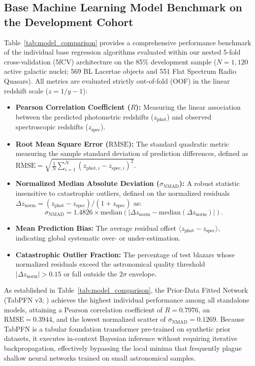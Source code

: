\documentclass[twocolumn,linenumbers,floatfix]{aastex701}
\begin{document}
\subsection{Base Machine Learning Model Benchmark on the Development Cohort}
\label{subsec:base_models_benchmark}

Table~\ref{tab:model_comparison} provides a comprehensive performance benchmark of the individual base regression algorithms evaluated within our nested 5-fold cross-validation (5fCV) architecture on the 85\% development sample ($N = 1{,}120$ active galactic nuclei; 569 BL Lacertae objects and 551 Flat Spectrum Radio Quasars). All metrics are evaluated strictly out-of-fold (OOF) in the linear redshift scale ($z = 1/y - 1$):
\begin{itemize}
    \item \textbf{Pearson Correlation Coefficient ($R$):} Measuring the linear association between the predicted photometric redshifts ($z_{\text{phot}}$) and observed spectroscopic redshifts ($z_{\text{spec}}$).
    \item \textbf{Root Mean Square Error ($\text{RMSE}$):} The standard quadratic metric measuring the sample standard deviation of prediction differences, defined as $\text{RMSE} = \sqrt{\frac{1}{N}\sum_{i=1}^N (z_{\text{phot}, i} - z_{\text{spec}, i})^2}$.
    \item \textbf{Normalized Median Absolute Deviation ($\sigma_{\text{NMAD}}$):} A robust statistic insensitive to catastrophic outliers, defined on the normalized residuals $\Delta z_{\text{norm}} = (z_{\text{phot}} - z_{\text{spec}}) / (1 + z_{\text{spec}})$ as:
    \begin{equation}
    \sigma_{\text{NMAD}} = 1.4826 \times \text{median}\left(|\Delta z_{\text{norm}} - \text{median}(\Delta z_{\text{norm}})|\right).
    \end{equation}
    \item \textbf{Mean Prediction Bias:} The average residual offset $\langle z_{\text{phot}} - z_{\text{spec}} \rangle$, indicating global systematic over- or under-estimation.
    \item \textbf{Catastrophic Outlier Fraction:} The percentage of test blazars whose normalized residuals exceed the astronomical quality threshold $|\Delta z_{\text{norm}}| > 0.15$ or fall outside the $2\sigma$ envelope.
\end{itemize}

As established in Table~\ref{tab:model_comparison}, the Prior-Data Fitted Network (TabPFN v3; \citealt{Hollmann2022, Hollmann2025}) achieves the highest individual performance among all standalone models, attaining a Pearson correlation coefficient of $R = 0.7976$, an $\text{RMSE} = 0.3944$, and the lowest normalized scatter of $\sigma_{\text{NMAD}} = 0.1269$. Because TabPFN is a tabular foundation transformer pre-trained on synthetic prior datasets, it executes in-context Bayesian inference without requiring iterative backpropagation, effectively bypassing the local minima that frequently plague shallow neural networks trained on small astronomical samples.
\end{document}
